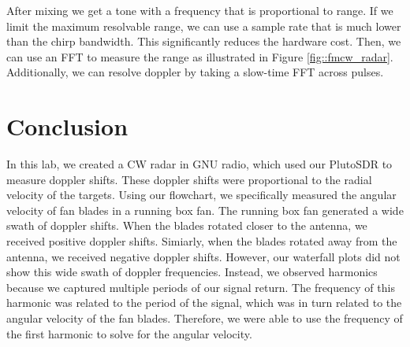 \documentclass{article}
\begin{document}
\noindent After mixing we get a tone with a frequency that is proportional to range. If we limit the maximum resolvable range, we can use a sample rate that is much lower than the chirp bandwidth. This significantly reduces the hardware cost. Then, we can use an FFT to measure the range as illustrated in Figure \ref{fig::fmcw_radar}. Additionally, we can resolve doppler by taking a slow-time FFT across pulses.

\section{Conclusion}

In this lab, we created a CW radar in GNU radio, which used our PlutoSDR to measure doppler shifts. These doppler shifts were proportional to the radial velocity of the targets. Using our flowchart, we specifically measured the angular velocity of fan blades in a running box fan. The running box fan generated a wide swath of doppler shifts. When the blades rotated closer to the antenna, we received positive doppler shifts. Simiarly, when the blades rotated away from the antenna, we received negative doppler shifts. However, our waterfall plots did not show this wide swath of doppler frequencies. Instead, we observed harmonics because we captured multiple periods of our signal return. The frequency of this harmonic was related to the period of the signal, which was in turn related to the angular velocity of the fan blades. Therefore, we were able to use the frequency of the first harmonic to solve for the angular velocity.

 




{}
\end{document}
